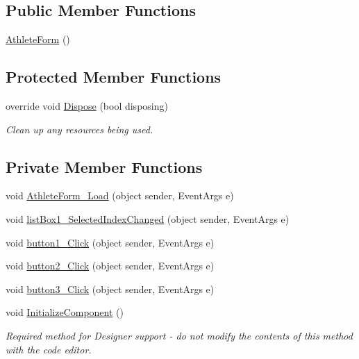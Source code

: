 \subsection*{Public Member Functions}
\begin{DoxyCompactItemize}
\item 
\hyperlink{classPCO_1_1__0_1_1AthleteForm_a3a129c00c114ef80d97231dfa01e2d6f}{Athlete\+Form} ()
\end{DoxyCompactItemize}
\subsection*{Protected Member Functions}
\begin{DoxyCompactItemize}
\item 
override void \hyperlink{classPCO_1_1__0_1_1AthleteForm_a28a1dc2c4ccd788db94afe809d281df3}{Dispose} (bool disposing)
\begin{DoxyCompactList}\small\item\em Clean up any resources being used. \end{DoxyCompactList}\end{DoxyCompactItemize}
\subsection*{Private Member Functions}
\begin{DoxyCompactItemize}
\item 
void \hyperlink{classPCO_1_1__0_1_1AthleteForm_adb6a10dd23db479964768b71cac7c6e2}{Athlete\+Form\+\_\+\+Load} (object sender, Event\+Args e)
\item 
void \hyperlink{classPCO_1_1__0_1_1AthleteForm_a00446a6a149c1afa1a7c8e4b6b4fc14a}{list\+Box1\+\_\+\+Selected\+Index\+Changed} (object sender, Event\+Args e)
\item 
void \hyperlink{classPCO_1_1__0_1_1AthleteForm_a0ec9eb6075e62e7d5b376b681e171414}{button1\+\_\+\+Click} (object sender, Event\+Args e)
\item 
void \hyperlink{classPCO_1_1__0_1_1AthleteForm_aae4000b1be563d683ade5454b2c88349}{button2\+\_\+\+Click} (object sender, Event\+Args e)
\item 
void \hyperlink{classPCO_1_1__0_1_1AthleteForm_afb260385ed6476b844cdc357bf11df25}{button3\+\_\+\+Click} (object sender, Event\+Args e)
\item 
void \hyperlink{classPCO_1_1__0_1_1AthleteForm_aa5ce4e96e22a27bed4a483bb549c2619}{Initialize\+Component} ()
\begin{DoxyCompactList}\small\item\em Required method for Designer support -\/ do not modify the contents of this method with the code editor. \end{DoxyCompactList}\end{DoxyCompactItemize}
